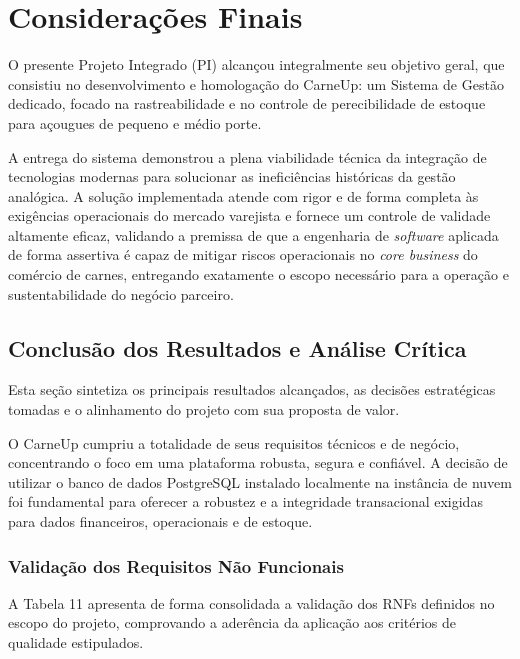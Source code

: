 \documentclass[
	12pt,				%
	openany,			%
	oneside,			%
	a4paper,			%
	english,			%
	french,				%
	spanish,			%
	brazil				%
	]{abntex2}
\begin{document}
\chapter{Considerações Finais}
\label{cap:conclusao}

O presente Projeto Integrado (PI) alcançou integralmente seu objetivo geral, que consistiu no desenvolvimento e homologação do CarneUp: um Sistema de Gestão dedicado, focado na rastreabilidade e no controle de perecibilidade de estoque para açougues de pequeno e médio porte. 

A entrega do sistema demonstrou a plena viabilidade técnica da integração de tecnologias modernas para solucionar as ineficiências históricas da gestão analógica. A solução implementada atende com rigor e de forma completa às exigências operacionais do mercado varejista e fornece um controle de validade altamente eficaz, validando a premissa de que a engenharia de \textit{software} aplicada de forma assertiva é capaz de mitigar riscos operacionais no \textit{core business} do comércio de carnes, entregando exatamente o escopo necessário para a operação e sustentabilidade do negócio parceiro.

\section{Conclusão dos Resultados e Análise Crítica}

Esta seção sintetiza os principais resultados alcançados, as decisões estratégicas tomadas e o alinhamento do projeto com sua proposta de valor.

O CarneUp cumpriu a totalidade de seus requisitos técnicos e de negócio, concentrando o foco em uma plataforma robusta, segura e confiável. A decisão de utilizar o banco de dados PostgreSQL instalado localmente na instância de nuvem foi fundamental para oferecer a robustez e a integridade transacional exigidas para dados financeiros, operacionais e de estoque.

\subsection{Validação dos Requisitos Não Funcionais}

A Tabela 11 apresenta de forma consolidada a validação dos RNFs definidos no escopo do projeto, comprovando a aderência da aplicação aos critérios de qualidade estipulados.
\end{document}

